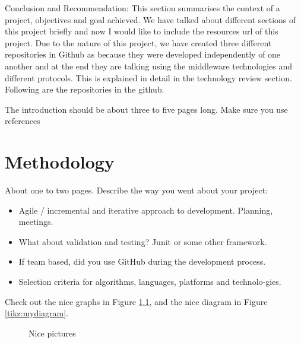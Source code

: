 	Conclusion and Recommendation: This section summarises the context of a project, objectives and goal achieved. 
	We have talked about different sections of this project briefly and now I would like  to include the resources url of this project.  Due to the nature of this project, we have created three different repositories in Github as because they were developed independently of one another and at the end they are talking using the middleware technologies and different protocols. This is explained in detail in the technology review section.  Following are the repositories in the github.
	

		
The introduction should be about three to five pages long.
Make sure you use references~\cite{einstein}

\chapter{Methodology}
About one to two pages.
Describe the way you went about your project:
\begin{itemize}
	\item Agile / incremental and iterative approach to development. Planning, meetings.
	\item What about validation and testing? Junit or some other framework.
	\item If team based, did you use GitHub during the development process.
	\item Selection criteria for algorithms, languages, platforms and technolo-gies.
\end{itemize}
Check out the nice graphs in Figure \ref{tikz:graphs}, and the nice diagram in Figure \ref{tikz:mydiagram}.

\begin{figure}
	\centering
	\hspace{1.5cm}
	\caption{Nice pictures}
	\label{tikz:graphs}
\end{figure}


